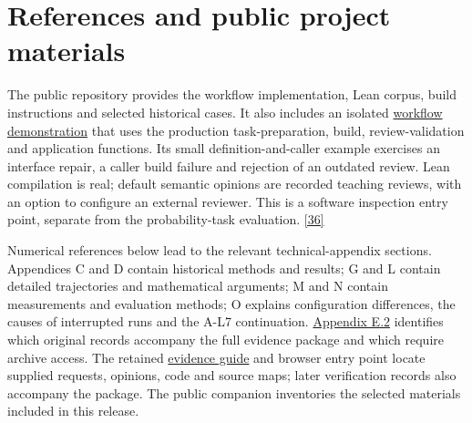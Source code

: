 \section[References and public project materials]{\texorpdfstring{\protect\hypertarget{section-7}{}References and public project materials}{References and public project materials}}
The public repository provides the workflow implementation, Lean corpus, build instructions and selected historical cases. It also includes an isolated \href{https://github.com/Kind-NK-Hill/ProbabilityTheoryFormalization/blob/d07f272850899b58612adf1c7dc202538503252f/docs/workflow_demo.md}{workflow demonstration} that uses the production task-preparation, build, review-validation and application functions. Its small definition-and-caller example exercises an interface repair, a caller build failure and rejection of an outdated review. Lean compilation is real; default semantic opinions are recorded teaching reviews, with an option to configure an external reviewer. This is a software inspection entry point, separate from the probability-task evaluation. \hyperlink{ref-36}{\mbox{[36]}}

Numerical references below lead to the relevant technical-appendix sections. Appendices C and D contain historical methods and results; G and L contain detailed trajectories and mathematical arguments; M and N contain measurements and evaluation methods; O explains configuration differences, the causes of interrupted runs and the A-L7 continuation. \href{en-appendix.pdf\#e2}{Appendix E.2} identifies which original records accompany the full evidence package and which require archive access. The retained \href{EVIDENCE_GUIDE.pdf}{evidence guide} and browser entry point locate supplied requests, opinions, code and source maps; later verification records also accompany the package. The public companion inventories the selected materials included in this release.


